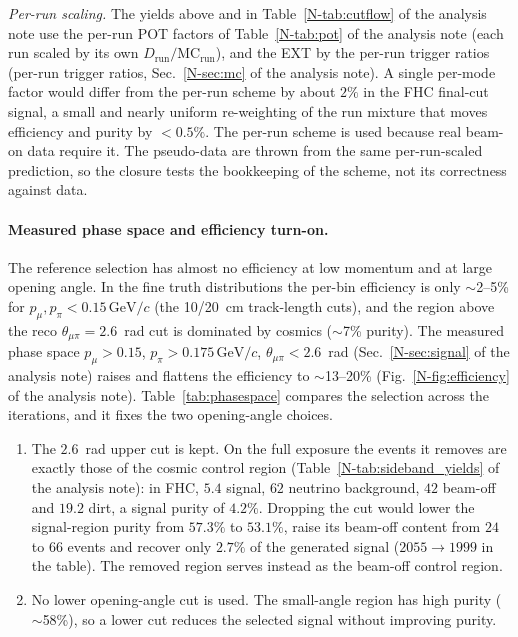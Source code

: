 \documentclass[11pt,a4paper]{article}
\newcommand{\GeVc}{\,\text{GeV}\!/c}
\newcommand{\noteref}[2]{#1~\ref{N-#2} of the analysis note}
\begin{document}
\noindent\emph{Per-run scaling.} The yields above and in \noteref{Table}{tab:cutflow} use
the per-run POT factors of \noteref{Table}{tab:pot} (each run scaled by its own
$D_{\text{run}}/\text{MC}_{\text{run}}$), and the EXT by the per-run trigger ratios
(per-run trigger ratios, \noteref{Sec.}{sec:mc}). A single per-mode factor would differ from the
per-run scheme by about $2\%$ in the FHC final-cut signal, a small and nearly uniform
re-weighting of the run mixture that moves efficiency and purity by $<0.5\%$. The per-run
scheme is used because real beam-on data require it. The pseudo-data are thrown
from the same per-run-scaled prediction, so the closure tests the bookkeeping of the
scheme, not its correctness against data.

\paragraph{Measured phase space and efficiency turn-on.}
The reference selection has almost no efficiency at low momentum and at large
opening angle. In the fine truth distributions the per-bin
efficiency is only $\sim$2--5\% for $p_\mu,p_\pi<0.15\GeVc$ (the 10/20~cm
track-length cuts), and the region above the reco $\theta_{\mu\pi}=2.6$~rad cut is
dominated by cosmics ($\sim$7\% purity). The measured phase space
$p_\mu>0.15$, $p_\pi>0.175\GeVc$, $\theta_{\mu\pi}<2.6$~rad
(\noteref{Sec.}{sec:signal}) raises and flattens the efficiency to $\sim$13--20\%
(\noteref{Fig.}{fig:efficiency}). Table~\ref{tab:phasespace} compares the selection
across the iterations, and it fixes the two opening-angle choices.
\begin{enumerate}[label=(\roman*),noitemsep]
  \item The $2.6$~rad upper cut is kept. On the full exposure the events it removes are
    exactly those of the cosmic control region (\noteref{Table}{tab:sideband_yields}): in
    FHC, $5.4$ signal, $62$ neutrino background, $42$ beam-off and $19.2$ dirt, a signal
    purity of $4.2\%$. Dropping the cut would lower the signal-region purity from $57.3\%$
    to $53.1\%$, raise its beam-off content from $24$ to $66$ events and recover only
    $2.7\%$ of the generated signal ($2055\to1999$ in the table). The removed region
    serves instead as the beam-off control region.
  \item No lower opening-angle cut is used. The small-angle region has high purity
    ($\sim$58\%), so a lower cut reduces the selected signal without improving purity.
\end{enumerate}
\end{document}
